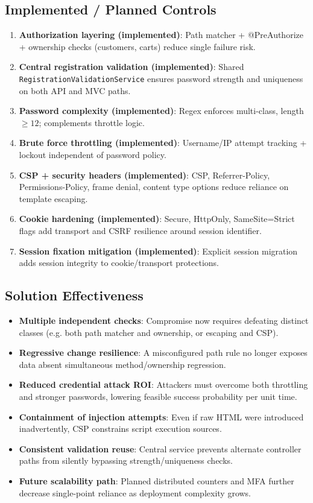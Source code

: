 \documentclass[]{UCD_CS_FYP_Report}
\begin{document}
\subsection*{Implemented / Planned Controls}
\begin{enumerate}
	\item \textbf{Authorization layering (implemented)}: Path matcher + @PreAuthorize + ownership checks (customers, carts) reduce single failure risk.
	\item \textbf{Central registration validation (implemented)}: Shared \texttt{RegistrationValidationService} ensures password strength and uniqueness on both API and MVC paths.
		\item \textbf{Password complexity (implemented)}: Regex enforces multi-class, length $\ge 12$; complements throttle logic.
	\item \textbf{Brute force throttling (implemented)}: Username/IP attempt tracking + lockout independent of password policy.
	\item \textbf{CSP + security headers (implemented)}: CSP, Referrer-Policy, Permissions-Policy, frame denial, content type options reduce reliance on template escaping.
	\item \textbf{Cookie hardening (implemented)}: Secure, HttpOnly, SameSite=Strict flags add transport and CSRF resilience around session identifier.
	\item \textbf{Session fixation mitigation (implemented)}: Explicit session migration adds session integrity to cookie/transport protections.
\end{enumerate}

\subsection*{Solution Effectiveness}
\begin{itemize}
	\item \textbf{Multiple independent checks}: Compromise now requires defeating distinct classes (e.g. both path matcher and ownership, or escaping and CSP).
	\item \textbf{Regressive change resilience}: A misconfigured path rule no longer exposes data absent simultaneous method/ownership regression.
	\item \textbf{Reduced credential attack ROI}: Attackers must overcome both throttling and stronger passwords, lowering feasible success probability per unit time.
	\item \textbf{Containment of injection attempts}: Even if raw HTML were introduced inadvertently, CSP constrains script execution sources.
	\item \textbf{Consistent validation reuse}: Central service prevents alternate controller paths from silently bypassing strength/uniqueness checks.
	\item \textbf{Future scalability path}: Planned distributed counters and MFA further decrease single-point reliance as deployment complexity grows.
\end{itemize}
\end{document}
